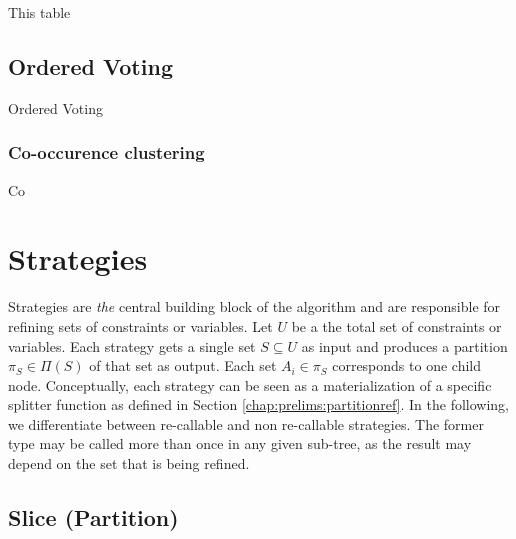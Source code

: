 			This table
			
			\clearpage
			
		\subsection{Ordered Voting}
		\label{chap:tree:classifiers:voting}
		
			Ordered Voting
		
			\clearpage
			
		\subsubsection{Co-occurence clustering}
		\label{chap:tree:classifiers:cooccurence}
		
			Co
			
			\clearpage
		
%	
%			
		
	\section{Strategies}
	
		Strategies are \textit{the} central building block of the algorithm and are responsible for refining sets of constraints or variables.
		Let $U$ be a the total set of constraints or variables.
		Each strategy gets a single set $S \subseteq U$ as input and produces a partition $\pi_S \in \Pi(S)$ of that set as output.
		Each set $A_i \in \pi_S$ corresponds to one child node.
		Conceptually, each strategy can be seen as a materialization of a specific splitter function as defined in Section \ref{chap:prelims:partitionref}.
		In the following, we differentiate between re-callable and non re-callable strategies. The former type may be called more than once in any given sub-tree, as the result may depend on the set that is being refined.
		
		\clearpage
	
		\subsection{Slice (Partition)}
		
